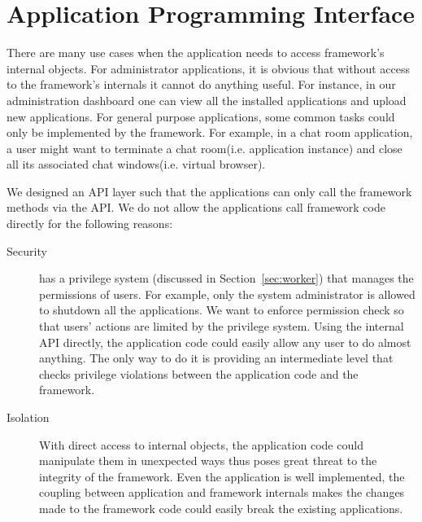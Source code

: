 \section{Application Programming Interface}
\label{sec:api}


There are many use cases when the application needs
to access framework's internal objects.
For administrator applications,
it is obvious that without access to the framework's internals
it cannot do anything useful.
For instance, in our administration dashboard one can
view all the installed applications and upload new applications.
For general purpose applications,
some common tasks could only be implemented by the framework.
For example,
in a chat room application,
a user might want to terminate a chat room(i.e. application instance)
and close all its associated chat windows(i.e. virtual browser).

We designed an API layer such that the applications can only call
the framework methods via the API.
We do not allow the applications call framework code directly for the
following reasons:

\begin{description}

\item[Security] \cb has a privilege system (discussed in
Section~\ref{sec:worker})  that manages the permissions of users. For example,
only the system administrator is allowed to shutdown all the  applications. We
want to enforce permission check so that users' actions  are limited by the
privilege system. Using the internal API directly, the application code could
easily allow any user to do almost anything. The only way to do it is
providing an intermediate level  that checks privilege violations between the
application code and the framework.

\item[Isolation] With direct access to internal objects, the application  code
could manipulate them in unexpected ways thus poses great threat to  the
integrity of the framework. Even the application is well implemented, the
coupling between application and framework internals makes the changes made to
the framework code could easily break the existing applications.
\end{description}


